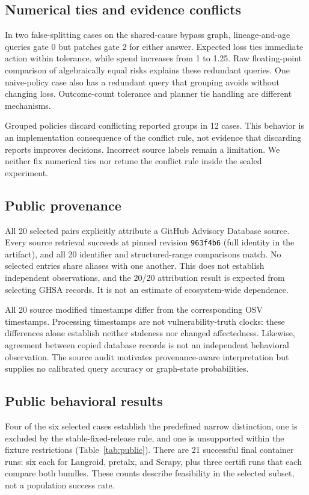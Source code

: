 \documentclass[manuscript,screen,nonacm]{acmart}
\begin{document}
\subsection{Numerical ties and evidence conflicts}
In two false-splitting cases on the shared-cause bypass graph, lineage-and-age queries gate 0 but patches gate 2 for either answer. Expected loss ties immediate action within tolerance, while spend increases from 1 to 1.25. Raw floating-point comparison of algebraically equal risks explains these redundant queries. One naive-policy case also has a redundant query that grouping avoids without changing loss. Outcome-count tolerance and planner tie handling are different mechanisms.

Grouped policies discard conflicting reported groups in 12 cases. This behavior is an implementation consequence of the conflict rule, not evidence that discarding reports improves decisions. Incorrect source labels remain a limitation. We neither fix numerical ties nor retune the conflict rule inside the sealed experiment.

\subsection{Public provenance}
All 20 selected pairs explicitly attribute a GitHub Advisory Database source. Every source retrieval succeeds at pinned revision \texttt{963f4b6} (full identity in the artifact), and all 20 identifier and structured-range comparisons match. No selected entries share aliases with one another. This does not establish independent observations, and the 20/20 attribution result is expected from selecting GHSA records. It is not an estimate of ecosystem-wide dependence.

All 20 source modified timestamps differ from the corresponding OSV timestamps. Processing timestamps are not vulnerability-truth clocks: these differences alone establish neither staleness nor changed affectedness. Likewise, agreement between copied database records is not an independent behavioral observation. The source audit motivates provenance-aware interpretation but supplies no calibrated query accuracy or graph-state probabilities.

\subsection{Public behavioral results}
\label{sec:public-results}
Four of the six selected cases establish the predefined narrow distinction, one is excluded by the stable-fixed-release rule, and one is unsupported within the fixture restrictions (Table~\ref{tab:public}). There are 21 successful final container runs: six each for Langroid, pretalx, and Scrapy, plus three certifi runs that each compare both bundles. These counts describe feasibility in the selected subset, not a population success rate.
\end{document}
